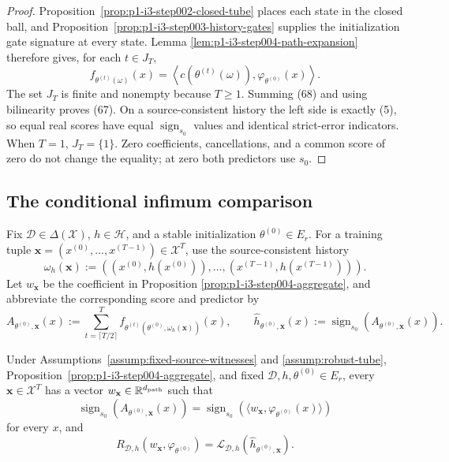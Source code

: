 \begin{proof}
Proposition~\ref{prop:p1-i3-step002-closed-tube} places each state in the
closed ball, and Proposition~\ref{prop:p1-i3-step003-history-gates} supplies
the initialization gate signature at every state.  Lemma
\ref{lem:p1-i3-step004-path-expansion} therefore gives, for each $t\in J_T$,
\[
f_{\theta^{(t)}(\omega)}(x)
=\left\langle c(\theta^{(t)}(\omega)),
\varphi_{\theta^{(0)}}(x)\right\rangle.
\tag{68}
\]
The set $J_T$ is finite and nonempty because $T\geq1$.  Summing (68) and
using bilinearity proves (67).  On a source-consistent history the left side
is exactly (5), so equal real scores have equal
$\operatorname{sign}_{s_0}$ values and identical strict-error indicators.
When $T=1$, $J_T=\{1\}$.  Zero coefficients, cancellations, and a common score
of zero do not change the equality; at zero both predictors use $s_0$.
\end{proof}

\subsection{The conditional infimum comparison}
\label{app:step005-risk}

Fix $\mathcal D\in\Delta(\mathcal X)$, $h\in\mathcal H$, and a stable
initialization $\theta^{(0)}\in E_r$.  For a training tuple
$\mathbf x=(x^{(0)},\ldots,x^{(T-1)})\in\mathcal X^T$, use the source-consistent
history
\[
\omega_h(\mathbf x):=((x^{(0)},h(x^{(0)})),\ldots,
(x^{(T-1)},h(x^{(T-1)}))).
\tag{69}
\]
Let $w_{\mathbf x}$ be the coefficient in Proposition
\ref{prop:p1-i3-step004-aggregate}, and abbreviate the corresponding score and
predictor by
\[
A_{\theta^{(0)},\mathbf x}(x):=
\sum_{t=\lceil T/2\rceil}^{T}
f_{\theta^{(t)}(\theta^{(0)},\omega_h(\mathbf x))}(x),
\qquad
\widehat h_{\theta^{(0)},\mathbf x}(x):=
\operatorname{sign}_{s_0}(A_{\theta^{(0)},\mathbf x}(x)).
\tag{70}
\]

\begin{lemma}
\label{lem:p1-i3-step005-pathwise-risk}
Under Assumptions~\ref{assump:fixed-source-witnesses} and
\ref{assump:robust-tube}, Proposition~\ref{prop:p1-i3-step004-aggregate},
and fixed $\mathcal D,h,\theta^{(0)}\in E_r$, every
$\mathbf x\in\mathcal X^T$ has a vector $w_{\mathbf x}\in\mathbb R^{d_{\rm path}}$
such that
\[
\operatorname{sign}_{s_0}(A_{\theta^{(0)},\mathbf x}(x))
=\operatorname{sign}_{s_0}
\left(\langle w_{\mathbf x},\varphi_{\theta^{(0)}}(x)\rangle\right)
\tag{71}
\]
for every $x$, and
\[
R_{\mathcal D,h}(w_{\mathbf x},\varphi_{\theta^{(0)}})
=\mathcal L_{\mathcal D,h}(\widehat h_{\theta^{(0)},\mathbf x}).
\tag{72}
\]
\end{lemma}

